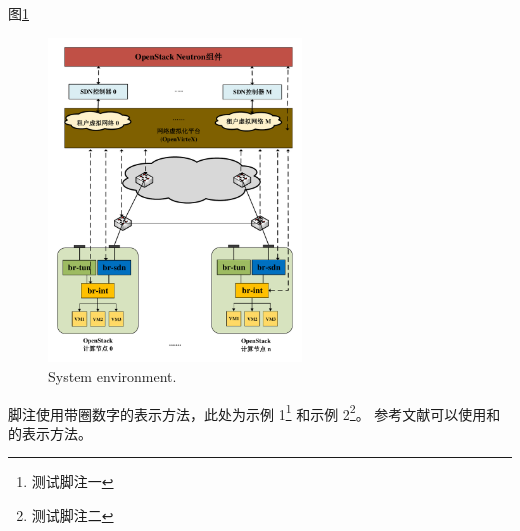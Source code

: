 图\ref{fig:env1}
\begin{figure}[!htb]
  \centering
  \includegraphics[width=0.6\textwidth]{logo/architecture}
  \caption{System environment.}
  \label{fig:env1}
\end{figure}

脚注使用带圈数字的表示方法，此处为示例 1\footnote{测试脚注一} 和示例 2\footnote{测试脚注二}。
参考文献可以使用\cite{BUPT_Thesis_Format_2014}和的表示方法。

\ifx\usechapbib\empty
\nocite{BSTcontrol}
\setcounter{NAT@ctr}{0}


\fi
